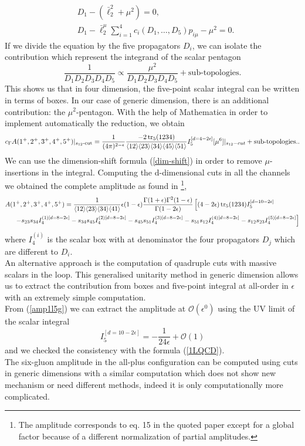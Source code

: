 \begin{align*}
	&D_1-(\bar \ell_2^2+\mu^2)=0,\\
	&D_1-\bar \ell_2^\mu \sum_{i=1}^4 c_i(D_1,\dots,D_5) p_{i\mu}-\mu^2=0.
\end{align*}
If we divide the equation by the five propagators $D_i$, we can isolate the contribution which represent the integrand of the scalar pentagon
$$
	\frac{1}{D_1D_2D_3D_4D_5}\propto \frac{\mu^2}{D_1D_2D_3D_4D_5} + \text{sub-topologies.}
$$
This shows us that in four dimension, the five-point scalar integral can be written in terms of boxes. In our case of generic dimension, there is an additional contribution: the $\mu^2$-pentagon. With the help of Mathematica in order to implement automatically the reduction, we obtain 
$$
	c_\Gamma A(1^+,2^+,3^+,4^+,5^+)|_{s_{12}\text{-cut}}=\frac{1}{(4\pi)^{2-\epsilon}}\frac{-2\tr_5(1234)}{\langle 12 \rangle \langle 23 \rangle \langle 34 \rangle \langle 45 \rangle \langle 51 \rangle}I_5^{[d=4-2\epsilon]}[\mu^6]|_{s_{12}-cut}+\text{sub-topologies.}.
$$
We can use the dimension-shift formula (\ref{dim-shift}) in order to remove $\mu$-insertions in the integral. Computing the d-dimensional cuts in all the channels we obtained the complete amplitude as found in \cite{1997}\footnote{The amplitude corresponds to eq. 15 in the quoted paper except for a global factor because of a different normalization of partial amplitudes.},
\begin{align*}
	&A(1^+,2^+,3^+,4^+,5^+)=\frac{1}{\langle 12 \rangle \langle 23 \rangle \langle 34 \rangle \langle 41 \rangle} \epsilon (1-\epsilon)\frac{\Gamma(1+\epsilon)\Gamma^2(1-\epsilon)}{\Gamma(1-2\epsilon)} \left[(4-2\epsilon)\tr_5(1234)I_5^{[d=10-2\epsilon]}\right.\\
	&\hspace{0.5cm}\left.-s_{23}s_{34}I_4^{(1)[d=8-2\epsilon]}-s_{34}s_{45}I_4^{(2)[d=8-2\epsilon]}-s_{45}s_{51}I_4^{(3)[d=8-2\epsilon]}-s_{51}s_{12}I_4^{(4)[d=8-2\epsilon]}-s_{12}s_{23}I_4^{(5)[d=8-2\epsilon]}\right] 	\label{amp1l5g}
\end{align*}
where $I_4^{(i)}$ is the scalar box with at denominator the four propagators $D_j$ which are different to $D_i$.\\
An alternative approach \cite{Brandhuber_2005} is the computation of quadruple cuts with massive scalars in the loop. This generalised unitarity method in generic dimension allows us to extract the contribution from boxes and five-point integral at all-order in $\epsilon$ with an extremely simple computation.\\
From (\ref{amp1l5g}) we can extract the amplitude at $\mathcal{O}(\epsilon^0)$ using the UV limit of the scalar integral
$$
	I_5^{[d=10-2\epsilon]}=-\frac{1}{24\epsilon}+\mathcal{O}(1)
$$
and we checked the consistency with the formula (\ref{1LQCD}).\\
The six-gluon amplitude in the all-plus configuration can be computed using cuts in generic dimensions with a similar computation which does not show new mechanism or need different methods, indeed it is only computationally more complicated.
